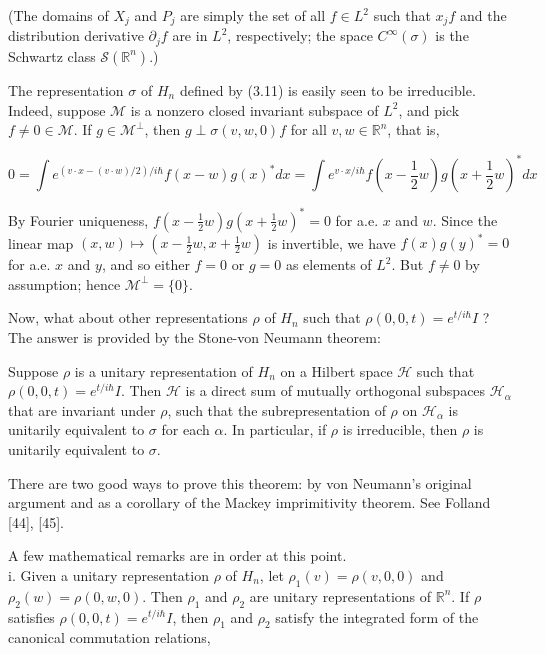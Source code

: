 \documentclass[10pt, letterpaper]{article}
\begin{document}
(The domains of $X_{j}$ and $P_{j}$ are simply the set of all $f \in L^{2}$ such that $x_{j} f$ and the distribution derivative $\partial_{j} f$ are in $L^{2}$, respectively; the space $C^{\infty}(\sigma)$ is the Schwartz class $\mathcal{S}\left(\mathbb{R}^{n}\right)$.)

The representation $\sigma$ of $H_{n}$ defined by (3.11) is easily seen to be irreducible. Indeed, suppose $\mathcal{M}$ is a nonzero closed invariant subspace of $L^{2}$, and pick $f \neq 0 \in \mathcal{M}$. If $g \in \mathcal{M}^{\perp}$, then $g \perp \sigma(v, w, 0) f$ for all $v, w \in \mathbb{R}^{n}$, that is,

$$
0=\int e^{(v \cdot x-(v \cdot w) / 2) / i \hbar} f(x-w) g(x)^{*} d x=\int e^{v \cdot x / i \hbar} f\left(x-\frac{1}{2} w\right) g\left(x+\frac{1}{2} w\right)^{*} d x
$$

By Fourier uniqueness, $f\left(x-\frac{1}{2} w\right) g\left(x+\frac{1}{2} w\right)^{*}=0$ for a.e. $x$ and $w$. Since the linear map $(x, w) \mapsto\left(x-\frac{1}{2} w, x+\frac{1}{2} w\right)$ is invertible, we have $f(x) g(y)^{*}=0$ for a.e. $x$ and $y$, and so either $f=0$ or $g=0$ as elements of $L^{2}$. But $f \neq 0$ by assumption; hence $\mathcal{M}^{\perp}=\{0\}$.

Now, what about other representations $\rho$ of $H_{n}$ such that $\rho(0,0, t)=e^{t / i \hbar} I$ ? The answer is provided by the Stone-von Neumann theorem:

Suppose $\rho$ is a unitary representation of $H_{n}$ on a Hilbert space $\mathcal{H}$ such that $\rho(0,0, t)=e^{t / i \hbar} I$. Then $\mathcal{H}$ is a direct sum of mutually orthogonal subspaces $\mathcal{H}_{\alpha}$ that are invariant under $\rho$, such that the subrepresentation of $\rho$ on $\mathcal{H}_{\alpha}$ is unitarily equivalent to $\sigma$ for each $\alpha$. In particular, if $\rho$ is irreducible, then $\rho$ is unitarily equivalent to $\sigma$.

There are two good ways to prove this theorem: by von Neumann's original argument and as a corollary of the Mackey imprimitivity theorem. See Folland [44], [45].

A few mathematical remarks are in order at this point.\\
i. Given a unitary representation $\rho$ of $H_{n}$, let $\rho_{1}(v)=\rho(v, 0,0)$ and $\rho_{2}(w)= \rho(0, w, 0)$. Then $\rho_{1}$ and $\rho_{2}$ are unitary representations of $\mathbb{R}^{n}$. If $\rho$ satisfies $\rho(0,0, t)=e^{t / i \hbar} I$, then $\rho_{1}$ and $\rho_{2}$ satisfy the integrated form of the canonical commutation relations,
\end{document}
